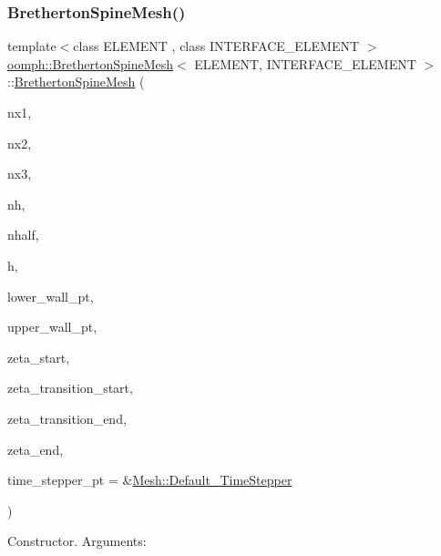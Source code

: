 \subsubsection{\texorpdfstring{Bretherton\+Spine\+Mesh()}{BrethertonSpineMesh()}}
{\footnotesize\ttfamily template$<$class E\+L\+E\+M\+E\+NT , class I\+N\+T\+E\+R\+F\+A\+C\+E\+\_\+\+E\+L\+E\+M\+E\+NT $>$ \\
\hyperlink{classoomph_1_1BrethertonSpineMesh}{oomph\+::\+Bretherton\+Spine\+Mesh}$<$ E\+L\+E\+M\+E\+NT, I\+N\+T\+E\+R\+F\+A\+C\+E\+\_\+\+E\+L\+E\+M\+E\+NT $>$\+::\hyperlink{classoomph_1_1BrethertonSpineMesh}{Bretherton\+Spine\+Mesh} (\begin{DoxyParamCaption}\item[{const unsigned \&}]{nx1,  }\item[{const unsigned \&}]{nx2,  }\item[{const unsigned \&}]{nx3,  }\item[{const unsigned \&}]{nh,  }\item[{const unsigned \&}]{nhalf,  }\item[{const double \&}]{h,  }\item[{\hyperlink{classoomph_1_1GeomObject}{Geom\+Object} $\ast$}]{lower\+\_\+wall\+\_\+pt,  }\item[{\hyperlink{classoomph_1_1GeomObject}{Geom\+Object} $\ast$}]{upper\+\_\+wall\+\_\+pt,  }\item[{const double \&}]{zeta\+\_\+start,  }\item[{const double \&}]{zeta\+\_\+transition\+\_\+start,  }\item[{const double \&}]{zeta\+\_\+transition\+\_\+end,  }\item[{const double \&}]{zeta\+\_\+end,  }\item[{\hyperlink{classoomph_1_1TimeStepper}{Time\+Stepper} $\ast$}]{time\+\_\+stepper\+\_\+pt = {\ttfamily \&\hyperlink{classoomph_1_1Mesh_a12243d0fee2b1fcee729ee5a4777ea10}{Mesh\+::\+Default\+\_\+\+Time\+Stepper}} }\end{DoxyParamCaption})}



Constructor. Arguments\+: 


